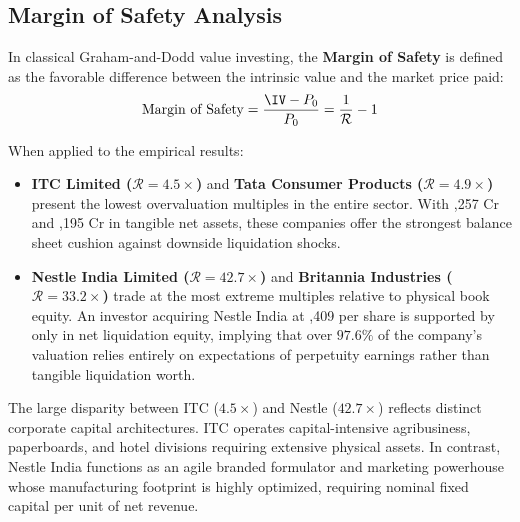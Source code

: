 \subsection{Margin of Safety Analysis}
In classical Graham-and-Dodd value investing, the \textbf{Margin of Safety} is defined as the favorable difference between the intrinsic value and the market price paid:
\begin{equation}
    \text{Margin of Safety} = \frac{\IV - P_0}{P_0} = \frac{1}{\mathcal{R}} - 1
\end{equation}

When applied to the empirical results:
\begin{itemize}
    \item \textbf{ITC Limited ($\mathcal{R} = 4.5\times$)} and \textbf{Tata Consumer Products ($\mathcal{R} = 4.9\times$)} present the lowest overvaluation multiples in the entire sector. With ,257 Cr and ,195 Cr in tangible net assets, these companies offer the strongest balance sheet cushion against downside liquidation shocks.
    \item \textbf{Nestle India Limited ($\mathcal{R} = 42.7\times$)} and \textbf{Britannia Industries ($\mathcal{R} = 33.2\times$)} trade at the most extreme multiples relative to physical book equity. An investor acquiring Nestle India at ,409 per share is supported by only  in net liquidation equity, implying that over $97.6\%$ of the company's valuation relies entirely on expectations of perpetuity earnings rather than tangible liquidation worth.
\end{itemize}

\begin{remarkbox}
The large disparity between ITC ($4.5\times$) and Nestle ($42.7\times$) reflects distinct corporate capital architectures. ITC operates capital-intensive agribusiness, paperboards, and hotel divisions requiring extensive physical assets. In contrast, Nestle India functions as an agile branded formulator and marketing powerhouse whose manufacturing footprint is highly optimized, requiring nominal fixed capital per unit of net revenue.
\end{remarkbox}
